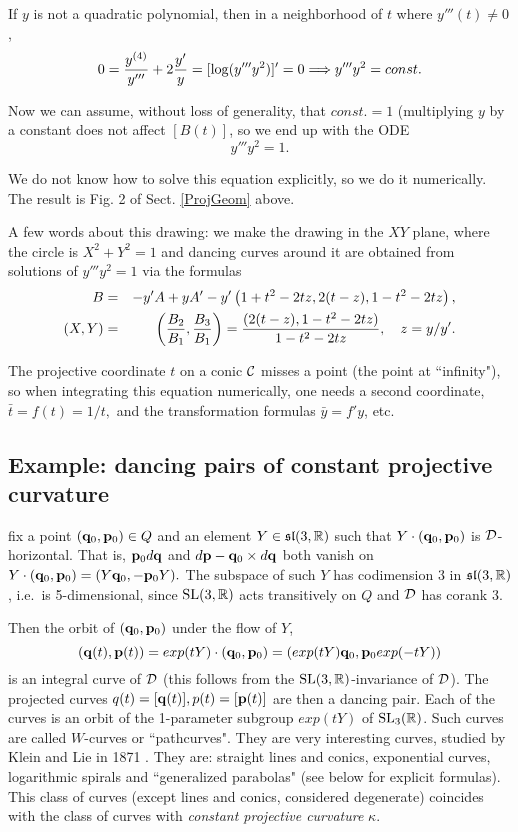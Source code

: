    
   
   
   
   
   If $y$ is not a quadratic polynomial, then  in a neighborhood of $t$ where $y'''(t) \neq 0$,
  $$0={y^{(4)}\over y'''}+2{y'\over y}=[\log (y''' y^2)]'=0\Longrightarrow y''' y^2=const.$$
  
 Now we can assume, without loss of generality, that $const.=1$ (multiplying $y$ by a constant does not affect $[B(t)]$, so we end up with the ODE
$$y'''y^2=1.$$ 

We do not know how to solve this equation explicitly, so we do it numerically. The result is Fig. 2 of Sect. \ref{ProjGeom} above.  

 A few words about this drawing: we make the drawing in the $XY$ plane, where the circle is $X^2+Y^2=1$ and dancing curves around it  are obtained from solutions of $y'''y^2=1 $ via the formulas
\begin{eqnarray*}
B&=&-y'A+yA'-y'\left(1+t^2-2tz,2(t-z), 1-t^2-2tz\right),\\
(X,Y)&=&\left({B_2\over B_1}, {B_3\over B_1}\right)={(2(t-z), 1-t^2-2tz)\over 1-t^2-2tz}, \quad z=y/y'.
\end{eqnarray*}


The projective coordinate $t$ on a conic  $\mathcal{C}$ misses a point (the point at ``infinity"), so when integrating this equation  numerically, one needs a second coordinate, $\bar  t=f(t) =1/t,$ and the transformation formulas $\bar  y=f'y$, etc. 


\subsection{Example: dancing  pairs of constant projective curvature}\label{const}
 
  fix a point 
$(\mathbf q_0,{\mathbf p}_0)\in Q$ and an element $Y\in\mathfrak{sl}(3,\mathbb{R})$  such that $Y\cdot(\mathbf q_0,{\mathbf p}_0)$ 
is ${\mathcal D}$-horizontal. That is, ${\mathbf p}_0d\mathbf q$ and $d{\mathbf p}-\mathbf q_0\times d\mathbf q$ both vanish on $Y\cdot (\mathbf q_0, {\mathbf p}_0)=(Y\mathbf q_0, -{\mathbf p}_0Y).$  The subspace of such $Y$ has codimension 3 in $\mathfrak{sl}(3,\mathbb{R})$, i.e.~is 5-dimensional, since $\mathrm{SL}(3,\mathbb{R})$ acts transitively on $Q$ and ${\mathcal D}$ has corank 3. 


Then the orbit of $(\mathbf q_0, {\mathbf p}_0)$ under the flow of $Y$, 
 $$(\mathbf q(t), {\mathbf p}(t))=exp(tY)\cdot(\mathbf q_0, {\mathbf p}_0)=(exp(tY)\mathbf q_0, {\mathbf p}_0exp(-tY))$$ 
 is an integral curve of ${\mathcal D}$
 (this follows from the $\mathrm{SL}(3,\mathbb{R})$-invariance of ${\mathcal D}$). The projected curves $q(t)=[\mathbf q(t)], p(t)=[{\mathbf p}(t)]$ are then a dancing pair. Each of the curves is an orbit of the 1-parameter subgroup $exp(tY)$ of ${\mathrm{SL}_3(\mathbb{R})}$. Such curves are called $W$-curves or ``pathcurves".  They are very interesting curves, studied by Klein and Lie in 1871 \cite{KLie}. They are: straight lines and conics,   exponential curves, logarithmic spirals  and ``generalized parabolas" (see below for explicit formulas).  This class of curves (except lines and conics, considered degenerate) coincides with the class of curves with {\em constant projective curvature} $\kappa$. 
 
